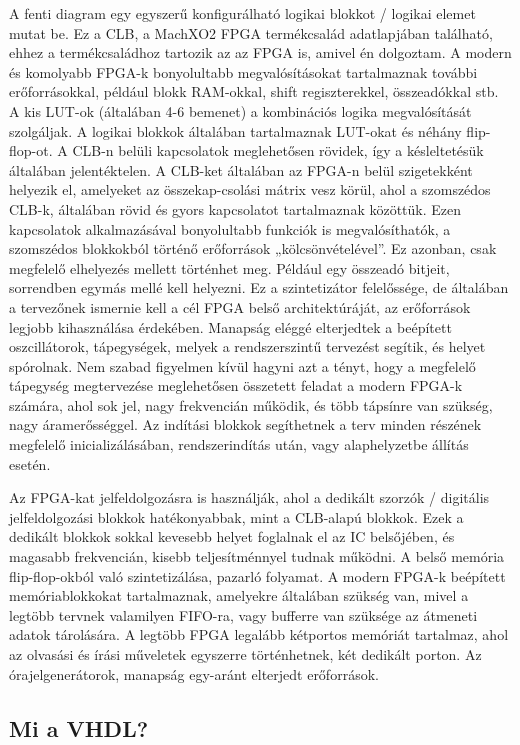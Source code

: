 \documentclass[a4paper,12pt,oneside]{book}
\begin{document}
A fenti diagram egy egyszerű konfigurálható logikai blokkot / logikai elemet mutat be. Ez a CLB, a MachXO2 FPGA termékcsalád adatlapjában található, ehhez a termékcsaládhoz tartozik az az FPGA is, amivel én dolgoztam. A modern és komolyabb FPGA-k bonyolultabb megvalósításokat tartalmaznak további erőforrásokkal, például blokk RAM-okkal, shift regiszterekkel, összeadókkal stb. A kis LUT-ok (általában 4-6 bemenet) a kombinációs logika megvalósítását szolgáljak. A logikai blokkok általában tartalmaznak LUT-okat és néhány flip-flop-ot. A CLB-n belüli kapcsolatok meglehetősen rövidek, így a késleltetésük általában jelentéktelen. A CLB-ket általában az FPGA-n belül szigetekként helyezik el, amelyeket az összekap-csolási mátrix vesz körül, ahol a szomszédos CLB-k, általában rövid és gyors kapcsolatot tartalmaznak közöttük. Ezen kapcsolatok alkalmazásával bonyolultabb funkciók is megvalósíthatók, a szomszédos blokkokból történő erőforrások „kölcsönvételével”. Ez azonban, csak megfelelő elhelyezés mellett történhet meg. Például egy összeadó bitjeit, sorrendben egymás mellé kell helyezni. Ez a szintetizátor felelőssége, de általában a tervezőnek ismernie kell a cél FPGA belső architektúráját, az erőforrások legjobb kihasználása érdekében. Manapság eléggé elterjedtek a beépített oszcillátorok, tápegységek, melyek a rendszerszintű tervezést segítik, és helyet spórolnak. Nem szabad figyelmen kívül hagyni azt a tényt, hogy a megfelelő tápegység megtervezése meglehetősen összetett feladat a modern FPGA-k számára, ahol sok jel, nagy frekvencián működik, és több tápsínre van szükség, nagy áramerősséggel. Az indítási blokkok segíthetnek a terv minden részének megfelelő inicializálásában, rendszerindítás után, vagy alaphelyzetbe állítás esetén. 

Az FPGA-kat jelfeldolgozásra is használják, ahol a dedikált szorzók / digitális jelfeldolgozási blokkok hatékonyabbak, mint a CLB-alapú blokkok. Ezek a dedikált blokkok sokkal kevesebb helyet foglalnak el az IC belsőjében, és magasabb frekvencián, kisebb teljesítménnyel tudnak működni. A belső memória flip-flop-okból való szintetizálása, pazarló folyamat. A modern FPGA-k beépített memóriablokkokat tartalmaznak, amelyekre általában szükség van, mivel a legtöbb tervnek valamilyen FIFO-ra, vagy bufferre van szüksége az átmeneti adatok tárolására. A legtöbb FPGA legalább kétportos memóriát tartalmaz, ahol az olvasási és írási műveletek egyszerre történhetnek, két dedikált porton. Az órajelgenerátorok, manapság egy-aránt elterjedt erőforrások.

\subsection{Mi a VHDL?}
\end{document}
